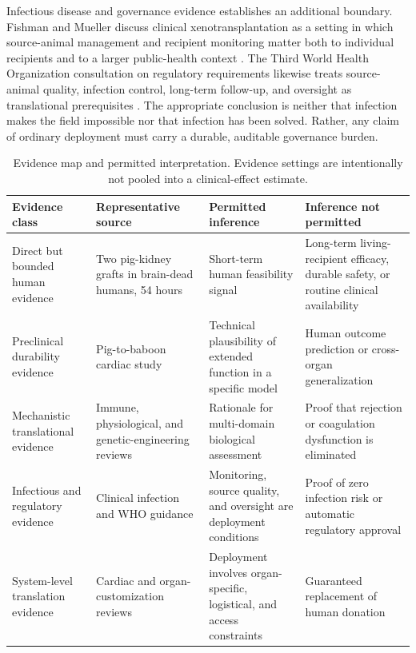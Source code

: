 \documentclass[conference]{IEEEtran}
\newcommand{\xeno}{xenotransplantation}
\begin{document}
Infectious disease and governance evidence establishes an additional boundary. Fishman and Mueller discuss clinical \xeno{} as a setting in which source-animal management and recipient monitoring matter both to individual recipients and to a larger public-health context \cite{fishman2024}. The Third World Health Organization consultation on regulatory requirements likewise treats source-animal quality, infection control, long-term follow-up, and oversight as translational prerequisites \cite{hawthorne2019}. The appropriate conclusion is neither that infection makes the field impossible nor that infection has been solved. Rather, any claim of ordinary deployment must carry a durable, auditable governance burden.

\begin{table}[t]
\caption{Evidence map and permitted interpretation. Evidence settings are intentionally not pooled into a clinical-effect estimate.}
\label{tab:evidence-map}
\centering
\renewcommand{\arraystretch}{1.18}
\begin{tabular}{|p{}|p{}|p{}|p{}|}
\hline
\textbf{Evidence class} & \textbf{Representative source} & \textbf{Permitted inference} & \textbf{Inference not permitted} \\
\hline
Direct but bounded human evidence & Two pig-kidney grafts in brain-dead humans, 54 hours \cite{montgomery2022} & Short-term human feasibility signal & Long-term living-recipient efficacy, durable safety, or routine clinical availability \\
\hline
Preclinical durability evidence & Pig-to-baboon cardiac study \cite{mohiuddin2022} & Technical plausibility of extended function in a specific model & Human outcome prediction or cross-organ generalization \\
\hline
Mechanistic translational evidence & Immune, physiological, and genetic-engineering reviews \cite{lei2022,zhou2022} & Rationale for multi-domain biological assessment & Proof that rejection or coagulation dysfunction is eliminated \\
\hline
Infectious and regulatory evidence & Clinical infection and WHO guidance \cite{fishman2024,hawthorne2019} & Monitoring, source quality, and oversight are deployment conditions & Proof of zero infection risk or automatic regulatory approval \\
\hline
System-level translation evidence & Cardiac and organ-customization reviews \cite{boulet2022,gao2023} & Deployment involves organ-specific, logistical, and access constraints & Guaranteed replacement of human donation \\
\hline
\end{tabular}
\end{table}
\end{document}
